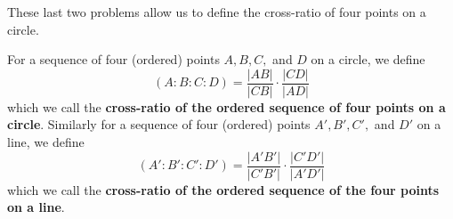 \documentclass{ximera}
\begin{document}

These last two problems allow us to define the cross-ratio of four
points on a circle.

\begin{definition}
For a sequence of four (ordered) points $A,B,C,$ and $D$ on a circle,
we define%
\[
\left(A:B:C:D\right)=
\frac{\left| AB\right|}{\left|CB\right|}\cdot
\frac{
\left|CD\right|
}{
\left|AD\right|
}%
\]
which we call the \textbf{cross-ratio of the ordered sequence of four
  points on a circle}.  Similarly for a sequence of four (ordered) points
$A',B',C',$ and $D'$ on a line, we define%
\[
\left(  A':B':C':D'\right)  =
\frac{\left| A'B'\right| }{\left| C'B'\right|
}\cdot
\frac{
\left|C'D'\right|
}{
\left|A'D'\right|
}
\]
which we call the \textbf{cross-ratio of the ordered sequence of the
  four points on a line}.
\end{definition}

\end{document}
